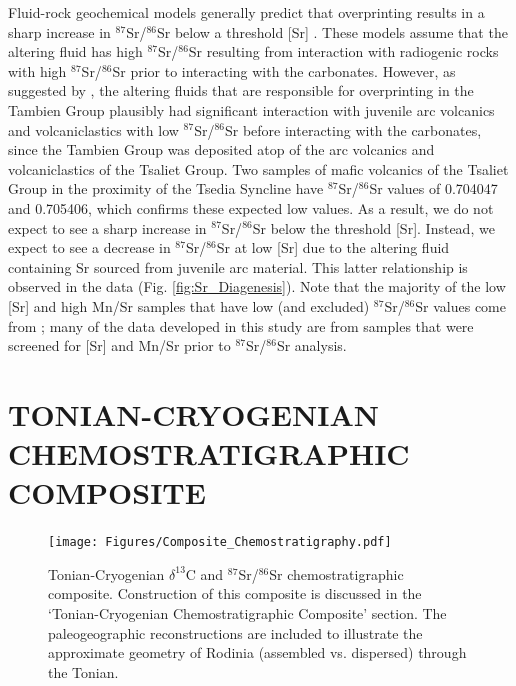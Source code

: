 \documentclass[11pt,letterpaper]{article}
\newcommand{\dC}{$\delta^{13}$C\xspace}
\newcommand{\SrSr}{$^{87}$Sr/$^{86}$Sr\xspace}
\begin{document}
Fluid-rock geochemical models generally predict that overprinting results in a sharp increase in \SrSr below a threshold [Sr] \citep{Banner1990a, Jacobsen1999a}. These models assume that the altering fluid has high \SrSr resulting from interaction with radiogenic rocks with high \SrSr prior to interacting with the carbonates. However, as suggested by \citet{Miller2009a}, the altering fluids that are responsible for overprinting in the Tambien Group plausibly had significant interaction with juvenile arc volcanics and volcaniclastics with low \SrSr before interacting with the carbonates, since the Tambien Group was deposited atop of the arc volcanics and volcaniclastics of the Tsaliet Group. Two samples of mafic volcanics of the Tsaliet Group in the proximity of the Tsedia Syncline have \SrSr values of 0.704047 and 0.705406, which confirms these expected low values. As a result, we do not expect to see a sharp increase in \SrSr below the threshold [Sr]. Instead, we expect to see a decrease in \SrSr at low [Sr] due to the altering fluid containing Sr sourced from juvenile arc material. This latter relationship is observed in the data (Fig. \ref{fig:Sr_Diagenesis}). Note that the majority of the low [Sr] and high Mn/Sr samples that have low (and excluded) \SrSr  values come from \citet{Miller2009a}; many of the data developed in this study are from samples that were screened for [Sr] and Mn/Sr prior to \SrSr analysis.

\section*{TONIAN-CRYOGENIAN CHEMOSTRATIGRAPHIC COMPOSITE \label{sec:CHEMOSTRATIGRAPHICCOMPOSITE}}

\begin{figure}[h!]
\begin{center}
	\texttt{[image: Figures/Composite\_Chemostratigraphy.pdf]}
	\caption{Tonian-Cryogenian \dC and \SrSr chemostratigraphic composite. Construction of this composite is discussed in the `Tonian-Cryogenian Chemostratigraphic Composite' section. The paleogeographic reconstructions are included to illustrate the approximate geometry of Rodinia (assembled vs. dispersed) through the Tonian.}
	\label{fig:Composite_Chemostratigraphy}
\end{center}
\end{figure}
\end{document}

